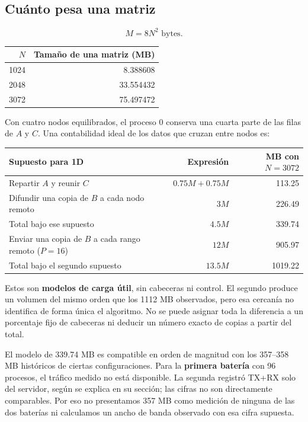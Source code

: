 \subsection{Cuánto pesa una matriz}
\[
 M=8N^2\text{ bytes}.
\]
\begin{center}
\begin{tabular}{rr}
\toprule
$N$ & Tamaño de una matriz (MB) \\
\midrule
1024 & 8.388608 \\
2048 & 33.554432 \\
3072 & 75.497472 \\
\bottomrule
\end{tabular}
\end{center}
Con cuatro nodos equilibrados, el proceso 0 conserva una cuarta parte de las filas de $A$ y $C$. Una contabilidad ideal de los datos que cruzan entre nodos es:
\begin{center}\small
\begin{tabular}{lrr}
\toprule
Supuesto para 1D & Expresión & MB con $N=3072$ \\
\midrule
Repartir $A$ y reunir $C$ & $0.75M+0.75M$ & 113.25 \\
Difundir una copia de $B$ a cada nodo remoto & $3M$ & 226.49 \\
Total bajo ese supuesto & $4.5M$ & 339.74 \\
Enviar una copia de $B$ a cada rango remoto ($P=16$) & $12M$ & 905.97 \\
Total bajo el segundo supuesto & $13.5M$ & 1019.22 \\
\bottomrule
\end{tabular}\end{center}

Estos son \textbf{modelos de carga útil}, sin cabeceras ni control. El segundo produce un volumen del mismo orden que los 1112 MB observados, pero esa cercanía no identifica de forma única el algoritmo. No se puede asignar toda la diferencia a un porcentaje fijo de cabeceras ni deducir un número exacto de copias a partir del total.

El modelo de 339.74 MB es compatible en orden de magnitud con los 357--358 MB históricos de ciertas configuraciones. Para la \textbf{primera batería} con 96 procesos, el tráfico medido no está disponible. La segunda registró TX+RX solo del servidor, según se explica en su sección; las cifras no son directamente comparables. Por eso no presentamos 357 MB como medición de ninguna de las dos baterías ni calculamos un ancho de banda observado con esa cifra supuesta.
